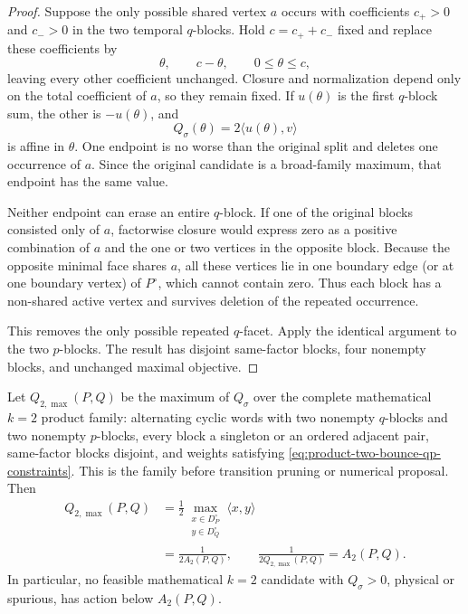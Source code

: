 \begin{unverified}
\begin{proof}
Suppose the only possible shared vertex \(a\) occurs with coefficients
\(c_+>0\) and \(c_->0\) in the two temporal \(q\)-blocks.  Hold
\(c=c_++c_-\) fixed and replace these coefficients by
\[
 \theta,\qquad c-\theta,\qquad 0\leq\theta\leq c,
\]
leaving every other coefficient unchanged.  Closure and normalization depend
only on the total coefficient of \(a\), so they remain fixed.  If
\(u(\theta)\) is the first \(q\)-block sum, the other is
\(-u(\theta)\), and
\[
 Q_\sigma(\theta)=2\langle u(\theta),v\rangle
\]
is affine in \(\theta\).  One endpoint is no worse than the original split
and deletes one occurrence of \(a\).  Since the original candidate is a
broad-family maximum, that endpoint has the same value.

Neither endpoint can erase an entire \(q\)-block.  If one of the original
blocks consisted only of \(a\), factorwise closure would express zero as a
positive combination of \(a\) and the one or two vertices in the opposite
block.  Because the opposite minimal face shares \(a\), all these vertices
lie in one boundary edge (or at one boundary vertex) of \(P^\circ\), which
cannot contain zero.  Thus each block has a non-shared active vertex and
survives deletion of the repeated occurrence.

This removes the only possible repeated \(q\)-facet.  Apply the identical
argument to the two \(p\)-blocks.  The result has disjoint same-factor blocks,
four nonempty blocks, and unchanged maximal objective.
\end{proof}

\begin{theorem}[Complete mathematical \(k=2\) product QP]
\label{thm:product-two-bounce-complete-qp}
Let \(Q_{2,\max}(P,Q)\) be the maximum of \(Q_\sigma\) over the complete
mathematical \(k=2\) product family: alternating cyclic words with two
nonempty \(q\)-blocks and two nonempty \(p\)-blocks, every block a singleton
or an ordered adjacent pair, same-factor blocks disjoint, and weights
satisfying \eqref{eq:product-two-bounce-qp-constraints}.  This is the family
before transition pruning or numerical proposal.  Then
\begin{equation}
\label{eq:product-two-bounce-complete-qp}
 \begin{split}
 Q_{2,\max}(P,Q)
 &=\frac12\max_{\substack{x\in D_P^\circ\\y\in D_Q^\circ}}
      \langle x,y\rangle\\
 &=\frac1{2A_2(P,Q)},
 \qquad
 \frac1{2Q_{2,\max}(P,Q)}=A_2(P,Q).
 \end{split}
\end{equation}
In particular, no feasible mathematical \(k=2\) candidate with
\(Q_\sigma>0\), physical or spurious, has action below \(A_2(P,Q)\).
\end{theorem}


\end{unverified}
